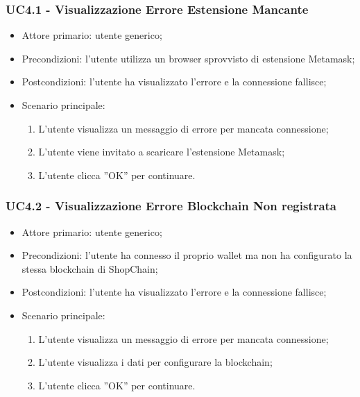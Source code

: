 \subsubsection{UC4.1 - Visualizzazione Errore Estensione Mancante}

\begin{itemize}
    \item Attore primario: utente generico;
    \item Precondizioni: l'utente utilizza un browser sprovvisto di estensione Metamask\glo{};
    \item Postcondizioni: l'utente ha visualizzato l'errore e la connessione fallisce;
    \item Scenario principale:
        \begin{enumerate}
            \item L'utente visualizza un messaggio di errore per mancata connessione;
            \item L'utente viene invitato a scaricare l'estensione Metamask\glo{};
            \item L'utente clicca ”OK” per continuare.
        \end{enumerate}
\end{itemize}

\subsubsection{UC4.2 - Visualizzazione Errore Blockchain Non registrata}

\begin{itemize}
    \item Attore primario: utente generico;
    \item Precondizioni: l'utente ha connesso il proprio wallet\glo{} ma non ha configurato la stessa blockchain\glo{} di ShopChain;
    \item Postcondizioni: l'utente ha visualizzato l'errore e la connessione fallisce;
    \item Scenario principale:
        \begin{enumerate}
            \item L'utente visualizza un messaggio di errore per mancata connessione;
            \item L'utente visualizza i dati per configurare la blockchain\glo{};
            \item L'utente clicca ”OK” per continuare.
        \end{enumerate}
\end{itemize}

